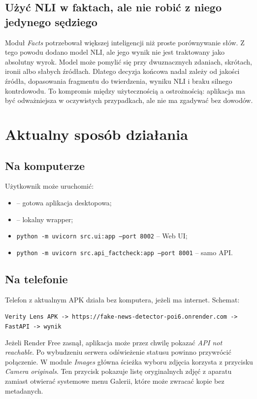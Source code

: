 \documentclass[12pt,a4paper]{article}
\begin{document}
\subsection{Użyć NLI w faktach, ale nie robić z niego jedynego sędziego}
Moduł \textit{Facts} potrzebował większej inteligencji niż proste porównywanie słów.
Z tego powodu dodano model NLI, ale jego wynik nie jest traktowany jako absolutny wyrok.
Model może pomylić się przy dwuznacznych zdaniach, skrótach, ironii albo słabych źródłach.
Dlatego decyzja końcowa nadal zależy od jakości źródła, dopasowania fragmentu do twierdzenia, wyniku NLI i braku silnego kontrdowodu.
To kompromis między użytecznością a ostrożnością: aplikacja ma być odważniejsza w oczywistych przypadkach, ale nie ma zgadywać bez dowodów.

\section{Aktualny sposób działania}
\subsection{Na komputerze}
Użytkownik może uruchomić:
\begin{itemize}
  \item {} -- gotowa aplikacja desktopowa;
  \item {} -- lokalny wrapper;
  \item \texttt{python -m uvicorn src.ui:app --port 8002} -- Web UI;
  \item \texttt{python -m uvicorn src.api\_factcheck:app --port 8001} -- samo API.
\end{itemize}

\subsection{Na telefonie}
Telefon z aktualnym APK działa bez komputera, jeżeli ma internet.
Schemat:
\begin{center}
\texttt{Verity Lens APK -> https://fake-news-detector-poi6.onrender.com -> FastAPI -> wynik}
\end{center}

Jeżeli Render Free zasnął, aplikacja może przez chwilę pokazać \textit{API not reachable}.
Po wybudzeniu serwera odświeżenie statusu powinno przywrócić połączenie.
W module \textit{Images} główna ścieżka wyboru zdjęcia korzysta z przycisku \textit{Camera originals}.
Ten przycisk pokazuje listę oryginalnych zdjęć z aparatu zamiast otwierać systemowe menu Galerii, które może zwracać kopie bez metadanych.
\end{document}
